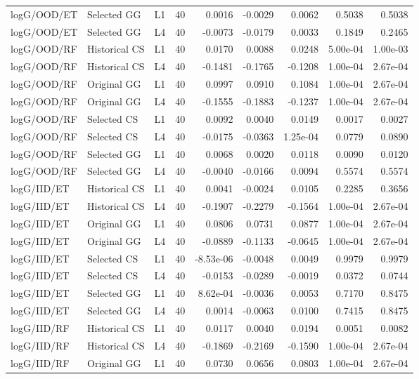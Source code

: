 \documentclass[9pt]{article}
\begin{document}
\begin{longtable}{p{2.0cm}p{1.35cm}ccrrrrr}
logG/OOD/ET & Selected GG & L1 & 40 & 0.0016 & -0.0029 & 0.0062 & 0.5038 & 0.5038\\
logG/OOD/ET & Selected GG & L4 & 40 & -0.0073 & -0.0179 & 0.0033 & 0.1849 & 0.2465\\
logG/OOD/RF & Historical CS & L1 & 40 & 0.0170 & 0.0088 & 0.0248 & 5.00e-04 & 1.00e-03\\
logG/OOD/RF & Historical CS & L4 & 40 & -0.1481 & -0.1765 & -0.1208 & 1.00e-04 & 2.67e-04\\
logG/OOD/RF & Original GG & L1 & 40 & 0.0997 & 0.0910 & 0.1084 & 1.00e-04 & 2.67e-04\\
logG/OOD/RF & Original GG & L4 & 40 & -0.1555 & -0.1883 & -0.1237 & 1.00e-04 & 2.67e-04\\
logG/OOD/RF & Selected CS & L1 & 40 & 0.0092 & 0.0040 & 0.0149 & 0.0017 & 0.0027\\
logG/OOD/RF & Selected CS & L4 & 40 & -0.0175 & -0.0363 & 1.25e-04 & 0.0779 & 0.0890\\
logG/OOD/RF & Selected GG & L1 & 40 & 0.0068 & 0.0020 & 0.0118 & 0.0090 & 0.0120\\
logG/OOD/RF & Selected GG & L4 & 40 & -0.0040 & -0.0166 & 0.0094 & 0.5574 & 0.5574\\
logG/IID/ET & Historical CS & L1 & 40 & 0.0041 & -0.0024 & 0.0105 & 0.2285 & 0.3656\\
logG/IID/ET & Historical CS & L4 & 40 & -0.1907 & -0.2279 & -0.1564 & 1.00e-04 & 2.67e-04\\
logG/IID/ET & Original GG & L1 & 40 & 0.0806 & 0.0731 & 0.0877 & 1.00e-04 & 2.67e-04\\
logG/IID/ET & Original GG & L4 & 40 & -0.0889 & -0.1133 & -0.0645 & 1.00e-04 & 2.67e-04\\
logG/IID/ET & Selected CS & L1 & 40 & -8.53e-06 & -0.0048 & 0.0049 & 0.9979 & 0.9979\\
logG/IID/ET & Selected CS & L4 & 40 & -0.0153 & -0.0289 & -0.0019 & 0.0372 & 0.0744\\
logG/IID/ET & Selected GG & L1 & 40 & 8.62e-04 & -0.0036 & 0.0053 & 0.7170 & 0.8475\\
logG/IID/ET & Selected GG & L4 & 40 & 0.0014 & -0.0063 & 0.0100 & 0.7415 & 0.8475\\
logG/IID/RF & Historical CS & L1 & 40 & 0.0117 & 0.0040 & 0.0194 & 0.0051 & 0.0082\\
logG/IID/RF & Historical CS & L4 & 40 & -0.1869 & -0.2169 & -0.1590 & 1.00e-04 & 2.67e-04\\
logG/IID/RF & Original GG & L1 & 40 & 0.0730 & 0.0656 & 0.0803 & 1.00e-04 & 2.67e-04\\

\end{longtable}
\end{document}
